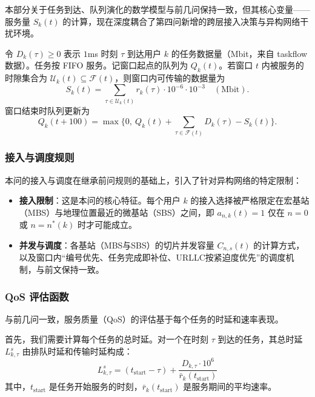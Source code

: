 本部分关于任务到达、队列演化的数学模型与前几问保持一致，但其核心变量——服务量 $S_k(t)$ 的计算，现在深度耦合了第四问新增的跨层接入决策与异构网络干扰环境。

令 $D_k(\tau)\ge 0$ 表示 $1$ms 时刻 $\tau$ 到达用户 $k$ 的任务数据量（Mbit，来自 taskflow 数据）。任务按 FIFO 服务。记窗口起点的队列为 $Q_k(t)$。若窗口 $t$ 内被服务的时隙集合为 $\mathcal{U}_k(t)\subseteq\mathcal{F}(t)$，则窗口内可传输的数据量为
\begin{equation}
 S_k(t)=\sum_{\tau\in\mathcal{U}_k(t)} r_k(\tau)\cdot 10^{-6}\cdot 10^{-3}\quad(\mathrm{Mbit}).
\end{equation}
窗口结束时队列更新为
\begin{equation}
 Q_k(t+100)=\max\Big\{0,\ Q_k(t)+\sum_{\tau\in\mathcal{F}(t)} D_k(\tau)-S_k(t)\Big\}.
\end{equation}

\subsubsection{接入与调度规则}

本问的接入与调度在继承前问规则的基础上，引入了针对异构网络的特定限制：
\begin{itemize}
  \item \textbf{接入限制}：这是本问的核心特征。每个用户 $k$ 的接入选择被严格限定在宏基站（MBS）与地理位置最近的微基站（SBS）之间，即 $a_{n,k}(t)=1$ 仅在 $n=0$ 或 $n=n^*(k)$ 时才可能成立。
  \item \textbf{并发与调度}：各基站（MBS与SBS）的切片并发容量 $C_{n,s}(t)$ 的计算方式，以及窗口内“编号优先、任务完成即补位、URLLC按紧迫度优先”的调度机制，与前文保持一致。
\end{itemize}

\subsubsection{QoS 评估函数}

与前几问一致，服务质量（QoS）的评估基于每个任务的时延和速率表现。

首先，我们需要计算每个任务的总时延。对一个在时刻 $\tau$ 到达的任务，其总时延 $L^{s}_{k,\tau}$ 由排队时延和传输时延构成：
\begin{equation}
    L^{s}_{k,\tau} = (t_{\text{start}} - \tau) + \frac{D_{k,\tau} \cdot 10^6}{\bar{r}_k(t_{\text{start}})}
\end{equation}
其中，$t_{\text{start}}$ 是任务开始服务的时刻，$\bar{r}_k(t_{\text{start}})$ 是服务期间的平均速率。

